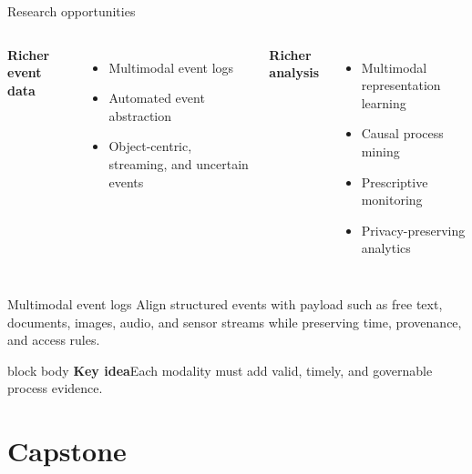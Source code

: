 \documentclass[aspectratio=169,11pt]{beamer}
\newcommand{\keyidea}[1]{%
  \begin{beamercolorbox}[rounded=true,sep=0.65em]{block body}
    \textbf{\color{Teal}Key idea}\quad #1
  \end{beamercolorbox}
}
\begin{document}
\begin{frame}{Research opportunities}
  \small
  \begin{columns}[T,onlytextwidth]
      \textbf{Richer event data}
      \begin{itemize}
        \item Multimodal event logs
        \item Automated event abstraction
        \item Object-centric, streaming, and uncertain events
      \end{itemize}
      \textbf{Richer analysis}
      \begin{itemize}
        \item Multimodal representation learning
        \item Causal process mining
        \item Prescriptive monitoring
        \item Privacy-preserving analytics
      \end{itemize}
  \end{columns}
  \vspace{0.15cm}
  \begin{block}{Multimodal event logs}
    Align structured events with payload such as free text, documents, images,
    audio, and sensor streams while preserving time, provenance, and access rules.
  \end{block}
  \vspace{0.05cm}
  \keyidea{Each modality must add valid, timely, and governable process evidence.}
\end{frame}

\section{Capstone}
\end{document}
